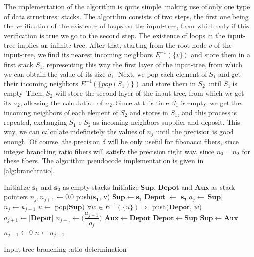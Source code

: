 \documentclass[12pt]{diazessay} %
\begin{document}
The implementation of the algorithm is quite simple, making use of only one type of data structures: stacks. The algorithm consists of two steps, the first one being the verification of the existence of loops on the input-tree, from which only if this verification is true we go to the second step. The existence of loops in the input-tree implies an infinite tree. After that, starting from the root node $v$ of the input-tree, we find its nearest incoming neighbors $E^{-1}(\{v\})$ and store them in a first stack $S_1$, representing this way the first layer of the input-tree, from which we can obtain the value of its size $a_1$. Next, we pop each element of $S_1$ and get their incoming neighbors $E^{-1}(\{pop(S_1)\})$ and store them in $S_2$ until $S_1$ is empty. Then, $S_2$ will store the second layer of the input-tree, from which we get its $a_2$, allowing the calculation of $n_2$. Since at this time $S_1$ is empty, we get the incoming neighbors of each element of $S_2$ and stores in $S_1$, and this process is repeated, exchanging $S_1$ e $S_2$ as incoming neighbors supplier and deposit. This way, we can calculate indefinetely the values of $n_j$ until the precision is good enough. Of course, the precision $\delta$ will be only useful for fibonacci fibers, since integer branching ratio fibers will satisfy the precision right way, since $n_3 = n_2$ for these fibers. The algorithm pseudocode implementation is given in \ref{alg:branchratio}.

\begin{algorithm}[!b]
	\SetAlgoLined
    Initialize $\mathbf{s_1}$ and $\mathbf{s_2}$ as empty stacks\;
	Initialize $\mathbf{Sup}$, $\mathbf{Depot}$ and $\mathbf{Aux}$ as stack pointers\;
	{
		$n_j, n_{j+1} \leftarrow 0.0$\;
		push($\mathbf{s_1}$, v)\;
		$\mathbf{Sup} \leftarrow \mathbf{s_1}$\;
		$\mathbf{Depot}$ $\leftarrow$ $\mathbf{s_2}$\;
		{
			$a_j \leftarrow |\mathbf{Sup}|$\;
			$n_j \leftarrow n_{j+1}$\;
			{
				$u \leftarrow $ pop($\mathbf{Sup}$)\;
				$\forall w \in E^{-1}(\{u\}) \Rightarrow$ push($\mathbf{Depot}$, $w$)\;
			}
			$a_{j+1} \leftarrow |\mathbf{Depot}|$\;
			$n_{j+1} \leftarrow \bigg(\dfrac{a_{j+1}}{a_j}\bigg)$\;
			$\mathbf{Aux} \leftarrow \mathbf{Depot}$\;
			$\mathbf{Depot} \leftarrow \mathbf{Sup}$\;
			$\mathbf{Sup} \leftarrow \mathbf{Aux}$\;
		}
	}
	{
		$n_{j+1} \leftarrow 0$\;
	}
	$n \leftarrow n_{j+1}$\;
	\caption{Input-tree branching ratio determination}
	\label{alg:branchratio}
\end{algorithm}
\end{document}
